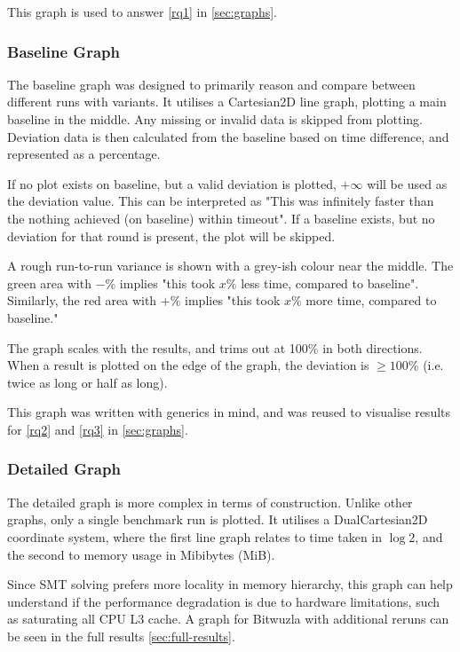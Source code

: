 \documentclass[a4paper]{report}
\begin{document}
This graph is used to answer \ref{rq1} in \ref{sec:graphs}.

\subsubsection{Baseline Graph}
The baseline graph was designed to primarily reason and compare between different runs with variants.
It utilises a Cartesian2D line graph, plotting a main baseline in the middle.
Any missing or invalid data is skipped from plotting.
Deviation data is then calculated from the baseline based on time difference, and represented as a percentage.

If no plot exists on baseline, but a valid deviation is plotted, $+\infty$ will be used as the deviation value.
This can be interpreted as "This was infinitely faster than the nothing achieved (on baseline) within timeout".
If a baseline exists, but no deviation for that round is present, the plot will be skipped.

A rough run-to-run variance is shown with a grey-ish colour near the middle.
The green area with $-\%$ implies "this took $x\%$ less time, compared to baseline".
Similarly, the red area with $+\%$ implies "this took $x\%$ more time, compared to baseline."

The graph scales with the results, and trims out at 100\% in both directions.
When a result is plotted on the edge of the graph, the deviation is $\geq 100\%$ (i.e. twice as long or half as long).

This graph was written with generics in mind, and was reused to visualise results for \ref{rq2} and \ref{rq3} in \ref{sec:graphs}.

\subsubsection{Detailed Graph}
The detailed graph is more complex in terms of construction.
Unlike other graphs, only a single benchmark run is plotted.
It utilises a DualCartesian2D coordinate system, where the first line graph relates to time taken in $\log 2$, and the second to memory usage in Mibibytes (MiB).

Since SMT solving prefers more locality in memory hierarchy, this graph can help understand if the performance degradation is due to hardware limitations, such as saturating all CPU L3 cache.
A graph for Bitwuzla with additional reruns can be seen in the full results \ref{sec:full-results}.

\pagebreak
\end{document}
